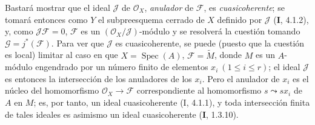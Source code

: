 \documentclass[10pt,oneside]{book}
\begin{document}
Bastará mostrar que el ideal $\mathscr J$ de $\mathscr O_X$,
\emph{anulador} de $\mathscr F$, es \emph{cuasicoherente}; se tomará entonces
como $Y$ el subpreesquema cerrado de $X$ definido por $\mathscr J$ (\textbf I, 4.1.2),
y, como $\mathscr J\mathscr F=0$, $\mathscr F$ es un
$(\mathscr O_X/\mathscr J)$-módulo y se resolverá la cuestión tomando
$\mathscr G=j^*(\mathscr F)$. Para ver que $\mathscr J$ es cuasicoherente, se
puede (puesto que la cuestión es local) limitar al caso en que
$X=\operatorname{Spec}(A)$, $\mathscr F=\widetilde M$, donde $M$ es un
$A$-módulo engendrado por un número finito de elementos
$x_i\ (1\leq i\leq r)$; el ideal $\mathscr J$ es entonces la intersección de
los anuladores de los $x_i$. Pero el anulador de $x_i$ es el núcleo del
homomorfismo $\mathscr O_X\to\mathscr F$ correspondiente al homomorfismo
$s\leadsto sx_i$ de $A$ en $M$; es, por tanto, un ideal cuasicoherente (I,
4.1.1), y toda intersección finita de tales ideales es asimismo un ideal
cuasicoherente (\textbf I, 1.3.10).
\end{document}
